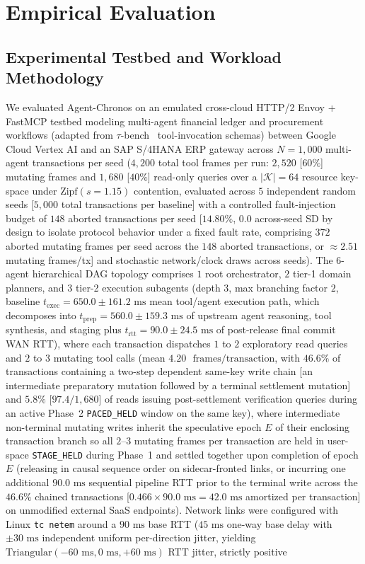 \documentclass[conference,10pt]{IEEEtran}
\begin{document}
\section{Empirical Evaluation}
\label{sec:evaluation}

\subsection{Experimental Testbed and Workload Methodology}
We evaluated Agent-Chronos on an emulated cross-cloud HTTP/2 Envoy + FastMCP testbed modeling multi-agent financial ledger and procurement workflows (adapted from $\tau$-bench~\cite{yao2024taubench} tool-invocation schemas) between Google Cloud Vertex AI and an SAP S/4HANA ERP gateway across $N = 1{,}000$ multi-agent transactions per seed ($4{,}200$ total tool frames per run: $2{,}520$ [$60\%$] mutating frames and $1{,}680$ [$40\%$] read-only queries over a $|\mathcal{K}| = 64$ resource key-space under $\text{Zipf}(s = 1.15)$ contention, evaluated across $5$ independent random seeds [$5{,}000$ total transactions per baseline] with a controlled fault-injection budget of $148$ aborted transactions per seed [$14.80\%$, $0.0$ across-seed SD by design to isolate protocol behavior under a fixed fault rate, comprising $372$ aborted mutating frames per seed across the $148$ aborted transactions, or $\approx 2.51$ mutating frames/tx] and stochastic network/clock draws across seeds). The 6-agent hierarchical DAG topology comprises $1$ root orchestrator, $2$ tier-1 domain planners, and $3$ tier-2 execution subagents (depth $3$, max branching factor $2$, baseline $t_{\text{exec}} = 650.0 \pm 161.2\text{ ms}$ mean tool/agent execution path, which decomposes into $t_{\text{prep}} = 560.0 \pm 159.3\text{ ms}$ of upstream agent reasoning, tool synthesis, and staging plus $t_{\text{rtt}} = 90.0 \pm 24.5\text{ ms}$ of post-release final commit WAN RTT), where each transaction dispatches $1$ to $2$ exploratory read queries and $2$ to $3$ mutating tool calls (mean $4.20\text{ }\mbox{frames/transaction}$, with $46.6\%$ of transactions containing a two-step dependent same-key write chain [an intermediate preparatory mutation followed by a terminal settlement mutation] and $5.8\%$ [$97.4/1{,}680$] of reads issuing post-settlement verification queries during an active Phase~2 \texttt{PACED\_HELD} window on the same key), where intermediate non-terminal mutating writes inherit the speculative epoch $E$ of their enclosing transaction branch so all $2\text{--}3$ mutating frames per transaction are held in user-space \texttt{STAGE\_HELD} during Phase~1 and settled together upon completion of epoch $E$ (releasing in causal sequence order on sidecar-fronted links, or incurring one additional $90.0\text{ ms}$ sequential pipeline RTT prior to the terminal write across the $46.6\%$ chained transactions [$0.466 \times 90.0\text{ ms} = 42.0\text{ ms}$ amortized per transaction] on unmodified external SaaS endpoints). Network links were configured with Linux \texttt{tc netem} around a $90\text{ ms}$ base RTT ($45\text{ ms}$ one-way base delay with $\pm 30\text{ ms}$ independent uniform per-direction jitter, yielding $\text{Triangular}(-60\text{ ms}, 0\text{ ms}, +60\text{ ms})$ RTT jitter, strictly positive 
\end{document}
